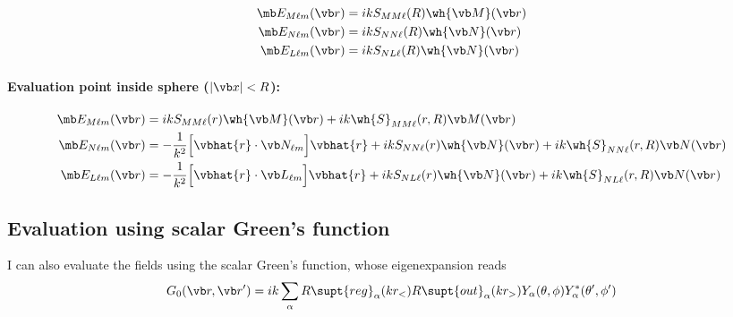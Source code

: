 \documentclass[letterpaper]{article}
\begin{document}
\begin{align*}
 \mb E_{M\ell m}(\vb r)&=ikS_{MM\ell}(R)\wh{\vb M}(\vb r) \\
 \mb E_{N\ell m}(\vb r)&=ikS_{NN\ell}(R)\wh{\vb N}(\vb r) \\
 \mb E_{L\ell m}(\vb r)&=ikS_{NL\ell}(R)\wh{\vb N}(\vb r) \\
\end{align*}

\paragraph{Evaluation point inside sphere ($|\vb x|<R$):}
\begin{subequations}
\begin{align}
 \mb E_{M\ell m}(\vb r)&=
    ik S_{MM\ell}(r)\wh{\vb M}(\vb r)
  + ik \wh{S}_{MM\ell}(r,R)\vb M(\vb r)
\\
 \mb E_{N\ell m}(\vb r)&=
    -\frac{1}{k^2}\Big[\vbhat{r}\cdot \vb N_{\ell m}\Big] \vbhat{r}
  + ik S_{NN\ell}(r)\wh{\vb N}(\vb r)
  + ik \wh{S}_{NN\ell}(r,R)\vb N(\vb r)
\\
 \mb E_{L\ell m}(\vb r)&=
    -\frac{1}{k^2}\Big[\vbhat{r}\cdot \vb L_{\ell m}\Big] \vbhat{r}
  + ik S_{NL\ell}(r)\wh{\vb N}(\vb r)
  + ik \wh{S}_{NL\ell}(r,R)\vb N(\vb r)
\end{align}
\label{InteriorEFields}
\end{subequations}

\subsection*{Evaluation using scalar Green's function}

I can also evaluate the fields using the scalar Green's function,
whose eigenexpansion reads
$$ G_0(\vb r, \vb r^\prime) 
   = ik\sum_{\alpha} R\supt{reg}_\alpha(kr_<) R\supt{out}_\alpha(kr_>)
     Y_{\alpha}(\theta,\phi) Y^*_\alpha(\theta^\prime, \phi^\prime)
$$
         
\end{document}
